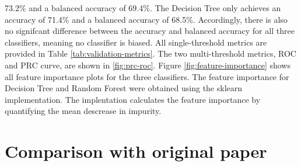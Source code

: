 73.2\% and a balanced accuracy of 69.4\%. The Decision Tree only achieves an 
accuracy of 71.4\% and a balanced accuracy of 68.5\%. Accordingly, there is 
also no signifcant difference between the accuracy and balanced accuracy for 
all three classifiers, meaning no classifier is biased.
All single-threshold metrics are provided in Table \ref{tab:validation-metrics}.
The two multi-threshold metrics, ROC and PRC curve, are shown in 
\ref{fig:prc-roc}.
Figure \ref{fig:feature-importance} shows all feature importance plots for the 
three classifiers. The feature importance for Decision Tree and Random Forest 
were obtained using the sklearn implementation. The implentation calculates the 
feature importance by quantifying the mean descrease in impurity.
\section{Comparison with original paper}
